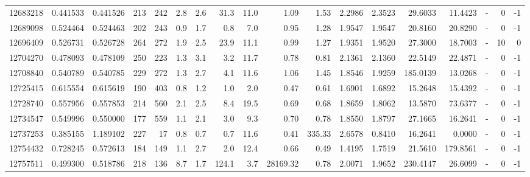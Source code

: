 \begin{tabular}{rrrrrrrrrrrrrrrlrr}
  12683218 & 0.441533 &   0.441526 &  213 &  242 &      2.8 &      2.6 &    31.3 &     11.0 &       1.09 &        1.53 &  2.2986 &  2.3523 &   29.6033 &   11.4423 &             - &        0 &         -1 \\
  12689098 & 0.524464 &   0.524463 &  202 &  243 &      0.9 &      1.7 &     0.8 &      7.0 &       0.95 &        1.28 &  1.9547 &  1.9547 &   20.8160 &   20.8290 &             - &        0 &         -1 \\
  12696409 & 0.526731 &   0.526728 &  264 &  272 &      1.9 &      2.5 &    23.9 &     11.1 &       0.99 &        1.27 &  1.9351 &  1.9520 &   27.3000 &   18.7003 &             - &       10 &          0 \\
  12704270 & 0.478093 &   0.478109 &  250 &  223 &      1.3 &      3.1 &     3.2 &     11.7 &       0.78 &        0.81 &  2.1361 &  2.1360 &   22.5149 &   22.4871 &             - &        0 &         -1 \\
  12708840 & 0.540789 &   0.540785 &  229 &  272 &      1.3 &      2.7 &     4.1 &     11.6 &       1.06 &        1.45 &  1.8546 &  1.9259 &  185.0139 &   13.0268 &             - &        0 &         -1 \\
  12725415 & 0.615554 &   0.615619 &  190 &  403 &      0.8 &      1.2 &     1.0 &      2.0 &       0.47 &        0.61 &  1.6901 &  1.6892 &   15.2648 &   15.4392 &             - &        0 &         -1 \\
  12728740 & 0.557956 &   0.557853 &  214 &  560 &      2.1 &      2.5 &     8.4 &     19.5 &       0.69 &        0.68 &  1.8659 &  1.8062 &   13.5870 &   73.6377 &             - &        0 &         -1 \\
  12734547 & 0.549996 &   0.550000 &  177 &  559 &      1.1 &      2.1 &     3.0 &      9.3 &       0.70 &        0.78 &  1.8550 &  1.8797 &   27.1665 &   16.2641 &             - &        0 &         -1 \\
  12737253 & 0.385155 &   1.189102 &  227 &   17 &      0.8 &      0.7 &     0.7 &     11.6 &       0.41 &      335.33 &  2.6578 &  0.8410 &   16.2641 &    0.0000 &             - &        0 &         -1 \\
  12754432 & 0.728245 &   0.572613 &  184 &  149 &      1.1 &      2.7 &     2.0 &     12.4 &       0.66 &        0.49 &  1.4195 &  1.7519 &   21.5610 &  179.8561 &             - &        0 &         -1 \\
  12757511 & 0.499300 &   0.518786 &  218 &  136 &      8.7 &      1.7 &   124.1 &      3.7 &   28169.32 &        0.78 &  2.0071 &  1.9652 &  230.4147 &   26.6099 &             - &        0 &         -1 \\

\end{tabular}
